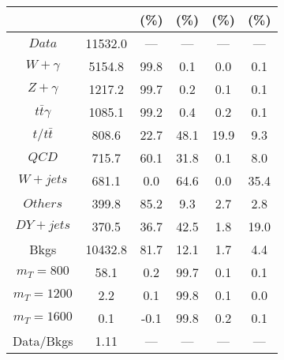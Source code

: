 \begin{figure}
\begin{minipage}[c]{0.32\textwidth}
{\begin{tabular}{cccccc}
 &  & (\%) & (\%) & (\%) & (\%)  \\
\hline
                                                                      $ Data $ &  11532.0 &  --- &  --- &  --- &  ---\\
$ W+\gamma $ &  5154.8 &  99.8 &  0.1 &  0.0 &  0.1\\
$ Z+\gamma $ &  1217.2 &  99.7 &  0.2 &  0.1 &  0.1\\
$ t\bar{t}\gamma $ &  1085.1 &  99.2 &  0.4 &  0.2 &  0.1\\
$ t/t\bar{t} $ &  808.6 &  22.7 &  48.1 &  19.9 &  9.3\\
$ QCD $ &  715.7 &  60.1 &  31.8 &  0.1 &  8.0\\
$ W+jets $ &  681.1 &  0.0 &  64.6 &  0.0 &  35.4\\
$ Others $ &  399.8 &  85.2 &  9.3 &  2.7 &  2.8\\
$ DY+jets $ &  370.5 &  36.7 &  42.5 &  1.8 &  19.0\\
Bkgs &  10432.8 &  81.7 &  12.1 &  1.7 &  4.4\\
$ m_{T} = 800 $ &  58.1 &  0.2 &  99.7 &  0.1 &  0.1\\
$ m_{T} = 1200 $ &  2.2 &  0.1 &  99.8 &  0.1 &  0.0\\
$ m_{T} = 1600 $ &  0.1 &  -0.1 &  99.8 &  0.2 &  0.1\\
Data/Bkgs &  1.11 &  --- &  --- &  --- &  ---\\
\hline
\end{tabular}
}
\end{minipage}
\end{figure}

